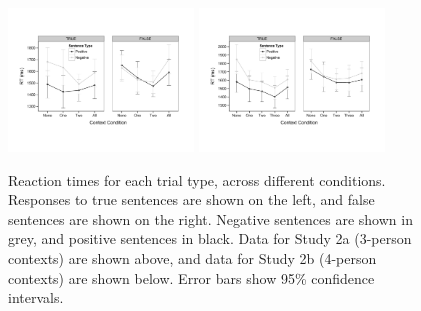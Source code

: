 \documentclass[10pt,letterpaper]{article}
\begin{document}
\begin{figure}
\begin{center} 
\includegraphics[height=1.5in]{figures/study2a_linegraph.pdf}
\includegraphics[height=1.5in]{figures/study2b_linegraph.pdf}
\caption{\label{fig:e2line} Reaction times for each trial type, across different conditions. Responses to true sentences are shown on the left, and false sentences are shown on the right.  Negative sentences are shown in grey, and positive sentences in black.  Data for Study 2a (3-person contexts) are shown above, and data for Study 2b (4-person contexts) are shown below.  Error bars show 95\% confidence intervals.  }
\end{center} 
\end{figure}

\end{document}
